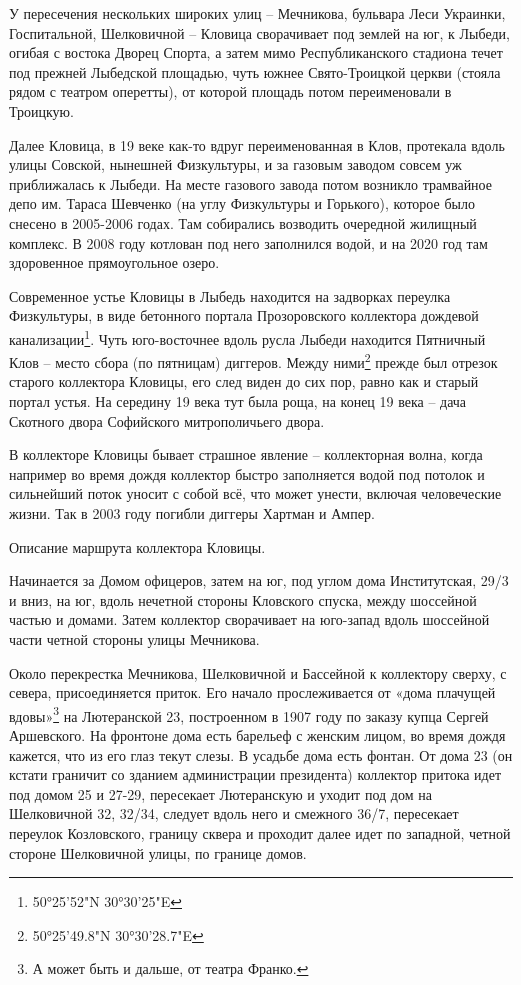 У пересечения нескольких широких улиц – Мечникова, бульвара Леси Украинки, Госпитальной, Шелковичной – Кловица сворачивает под землей на юг, к Лыбеди, огибая с востока Дворец Спорта, а затем мимо Республиканского стадиона течет под прежней Лыбедской площадью, чуть южнее Свято-Троицкой церкви (стояла рядом с театром оперетты), от которой площадь потом переименовали в Троицкую.

Далее Кловица, в 19 веке как-то вдруг переименованная в Клов, протекала вдоль улицы Совской, нынешней Физкультуры, и за газовым заводом совсем уж приближалась к Лыбеди. На месте газового завода потом возникло трамвайное депо им. Тараса Шевченко (на углу Физкультуры и Горького), которое было снесено в 2005-2006 годах. Там собирались возводить очередной жилищный комплекс. В 2008 году котлован под него заполнился водой, и на 2020 год там здоровенное прямоугольное озеро.

Современное устье Кловицы в Лыбедь находится на задворках переулка Физкультуры, в виде бетонного портала Прозоровского коллектора дождевой канализации\footnote{50°25'52"N 30°30'25"E}. Чуть юго-восточнее вдоль русла Лыбеди находится Пятничный Клов – место сбора (по пятницам) диггеров. Между ними\footnote{50°25'49.8"N 30°30'28.7"E} прежде был отрезок старого коллектора Кловицы, его след виден до сих пор, равно как и старый портал устья. На середину 19 века тут была роща, на конец 19 века – дача Скотного двора Софийского митрополичьего двора.

В коллекторе Кловицы бывает страшное явление – коллекторная волна, когда например во время дождя коллектор быстро заполняется водой под потолок и сильнейший поток уносит с собой всё, что может унести, включая человеческие жизни. Так в 2003 году погибли диггеры Хартман и Ампер.

Описание маршрута коллектора Кловицы.

Начинается за Домом офицеров, затем на юг, под углом дома Институтская, 29/3 и вниз, на юг, вдоль нечетной стороны Кловского спуска, между шоссейной частью и домами. Затем коллектор сворачивает на юго-запад вдоль шоссейной части четной стороны улицы Мечникова.

Около перекрестка Мечникова, Шелковичной и Бассейной к коллектору сверху, с севера, присоединяется приток. Его начало прослеживается от «дома плачущей вдовы»\footnote{А может быть и дальше, от театра Франко.} на Лютеранской 23, построенном в 1907 году по заказу купца Сергей Аршевского. На фронтоне дома есть барельеф с женским лицом, во время дождя кажется, что из его глаз текут слезы. В усадьбе дома есть фонтан.
От дома 23 (он кстати граничит со зданием администрации президента) коллектор притока идет под домом 25 и 27-29, пересекает Лютеранскую и уходит под дом на Шелковичной 32, 32/34, следует вдоль него и смежного 36/7, пересекает переулок Козловского, границу сквера и проходит далее идет по западной, четной стороне Шелковичной улицы, по границе домов.

